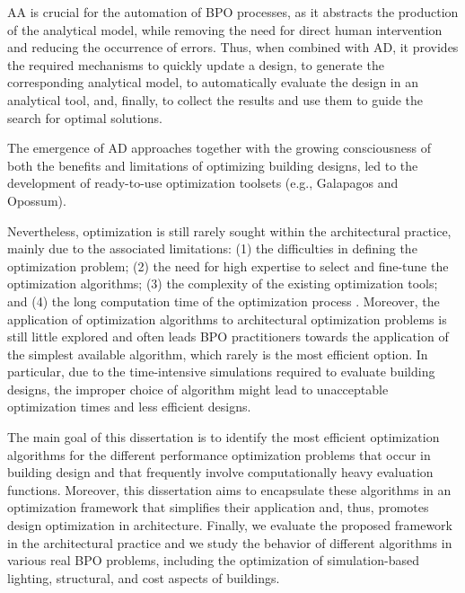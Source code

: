 	\ac{AA} is crucial for the automation of \ac{BPO} processes, as it abstracts the production of the analytical model, while removing the need for direct human intervention and reducing the occurrence of errors. Thus, when combined with \ac{AD}, it provides the required mechanisms to quickly update a design, to generate the corresponding analytical model, to automatically evaluate the design in an analytical tool, and, finally, to collect the results and use them to guide the search for optimal solutions. 

	The emergence of \ac{AD} approaches together with the growing consciousness of both the benefits and limitations of optimizing building designs, led to the development of ready-to-use optimization toolsets (e.g., Galapagos and Opossum). 
		
	Nevertheless, optimization is still rarely sought within the architectural practice, mainly due to the associated limitations: (1) the difficulties in defining the optimization problem; (2) the need for high expertise to select and fine-tune the optimization algorithms; (3) the complexity of the existing optimization tools; and (4) the long computation time of the optimization process \cite{Attia2013,Nguyen2014}. Moreover, the application of optimization algorithms to architectural optimization problems is still little explored and often leads \ac{BPO} practitioners towards the application of the simplest available algorithm, which rarely is the most efficient option. In particular, due to the time-intensive simulations required to evaluate building designs, the improper choice of algorithm might lead to unacceptable optimization times and less efficient designs. 

	The main goal of this dissertation is to identify the most efficient optimization algorithms for the different performance optimization problems that occur in building design and that frequently involve computationally heavy evaluation functions. Moreover, this dissertation aims to encapsulate these algorithms in an optimization framework that simplifies their application and, thus, promotes design optimization in architecture. Finally, we evaluate the proposed framework in the architectural practice and we study the behavior of different algorithms in various real \ac{BPO} problems, including the optimization of simulation-based lighting, structural, and cost aspects of buildings. 
	
